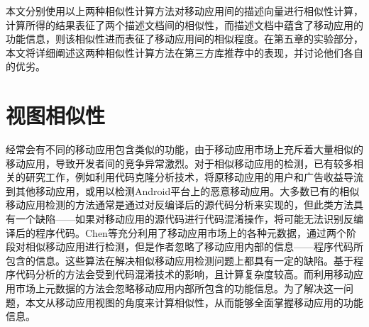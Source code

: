 本文分别使用以上两种相似性计算方法对移动应用间的描述向量进行相似性计算，计算所得的结果表征了两个描述文档间的相似性，而描述文档中蕴含了移动应用的功能信息，则该相似性进而表征了移动应用间的相似程度。在第五章的实验部分，本文将详细阐述这两种相似性计算方法在第三方库推荐中的表现，并讨论他们各自的优劣。



\section{视图相似性}
经常会有不同的移动应用包含类似的功能，由于移动应用市场上充斥着大量相似的移动应用，导致开发者间的竞争异常激烈。对于相似移动应用的检测，已有较多相关的研究工作，例如利用代码克隆分析技术，将原移动应用的用户和广告收益导流到其他移动应用\cite{gibler2013adrob}，或用以检测Android平台上的恶意移动应用\cite{zhou2012dissecting}。大多数已有的相似移动应用检测的方法通常是通过对反编译后的源代码分析来实现的，但此类方法具有一个缺陷——如果对移动应用的源代码进行代码混淆操作，将可能无法识别反编译后的程序代码。Chen等\cite{chen2015simapp}充分利用了移动应用市场上的各种元数据，通过两个阶段对相似移动应用进行检测，但是作者忽略了移动应用内部的信息——程序代码所包含的信息。这些算法在解决相似移动应用检测问题上都具有一定的缺陷。基于程序代码分析的方法会受到代码混淆技术的影响，且计算复杂度较高。而利用移动应用市场上元数据的方法会忽略移动应用内部所包含的功能信息。为了解决这一问题，本文从移动应用视图的角度来计算相似性，从而能够全面掌握移动应用的功能信息。


